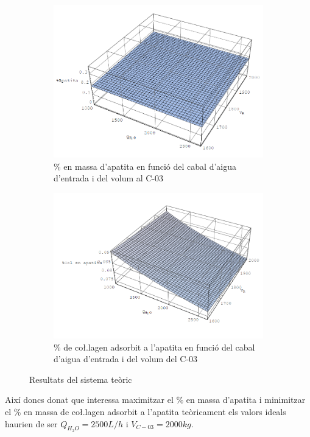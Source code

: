 \documentclass[a4paper]{article}
\begin{document}
\begin{figure}[H]
	\begin{subfigure}{0.46\textwidth}
		\centering
		\includegraphics[width=\textwidth]{images/graphs/apatita}
		\caption{\% en massa d'apatita en funció del cabal d'aigua d'entrada i del volum al C-03}
	\end{subfigure}
	\hfill
	\begin{subfigure}{0.46\textwidth}
		\centering
		\includegraphics[width=\textwidth]{images/graphs/colagen-apatita}
		\caption{\% de co\l.lagen adsorbit a l'apatita en funció del cabal d'aigua d'entrada i del volum del C-03}
	\end{subfigure}
	\caption{Resultats del sistema teòric}
\end{figure}

Així doncs donat que interessa maximitzar el \% en massa d'apatita i minimitzar el \% en massa de co\l.lagen adsorbit a l'apatita teòricament els valors ideals haurien de ser $Q_{H_2O} = 2500 L/h$ i $V_{C-03} = 2000 kg$.
\end{document}
